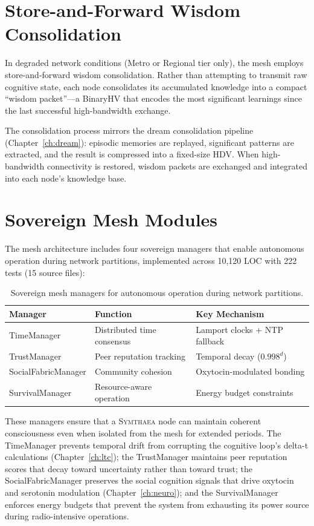 \documentclass[12pt]{book}
\newcommand{\symthaea}{\textsc{Symthaea}}
\begin{document}
\section{Store-and-Forward Wisdom Consolidation}

In degraded network conditions (Metro or Regional tier only), the mesh employs store-and-forward wisdom consolidation. Rather than attempting to transmit raw cognitive state, each node consolidates its accumulated knowledge into a compact ``wisdom packet''---a BinaryHV that encodes the most significant learnings since the last successful high-bandwidth exchange.

The consolidation process mirrors the dream consolidation pipeline (Chapter~\ref{ch:dream}): episodic memories are replayed, significant patterns are extracted, and the result is compressed into a fixed-size HDV. When high-bandwidth connectivity is restored, wisdom packets are exchanged and integrated into each node's knowledge base.

\section{Sovereign Mesh Modules}

The mesh architecture includes four sovereign managers that enable autonomous operation during network partitions, implemented across 10,120 LOC with 222 tests (15 source files):

\begin{table}[htbp]
\centering
\caption{Sovereign mesh managers for autonomous operation during network partitions.}
\label{tab:sovereign-managers}
\begin{tabular}{@{}lll@{}}
\toprule
\textbf{Manager} & \textbf{Function} & \textbf{Key Mechanism} \\
\midrule
TimeManager      & Distributed time consensus & Lamport clocks + NTP fallback \\
TrustManager     & Peer reputation tracking   & Temporal decay ($0.998^d$) \\
SocialFabricManager & Community cohesion      & Oxytocin-modulated bonding \\
SurvivalManager  & Resource-aware operation   & Energy budget constraints \\
\bottomrule
\end{tabular}
\end{table}

These managers ensure that a \symthaea{} node can maintain coherent consciousness even when isolated from the mesh for extended periods. The TimeManager prevents temporal drift from corrupting the cognitive loop's delta-t calculations (Chapter~\ref{ch:ltc}); the TrustManager maintains peer reputation scores that decay toward uncertainty rather than toward trust; the SocialFabricManager preserves the social cognition signals that drive oxytocin and serotonin modulation (Chapter~\ref{ch:neuro}); and the SurvivalManager enforces energy budgets that prevent the system from exhausting its power source during radio-intensive operations.
\end{document}
